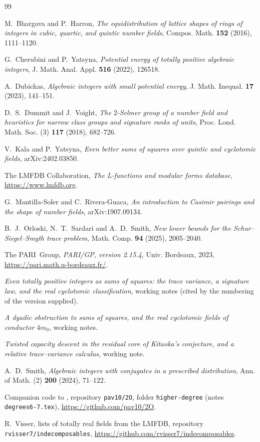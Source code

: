 \documentclass[11pt,reqno]{amsart}
\theoremstyle{plain}
\theoremstyle{definition}
\begin{document}
\begin{thebibliography}{99}

 M.~Bhargava and P.~Harron, \emph{The equidistribution of lattice shapes of rings of
integers in cubic, quartic, and quintic number fields}, Compos. Math. \textbf{152} (2016),
1111--1120.

 G.~Cherubini and P.~Yatsyna, \emph{Potential energy of totally positive algebraic
integers}, J. Math. Anal. Appl. \textbf{516} (2022), 126518.

 A.~Dubickas, \emph{Algebraic integers with small potential energy}, J. Math.
Inequal. \textbf{17} (2023), 141--151.

 D.~S.~Dummit and J.~Voight, \emph{The $2$-Selmer group of a number field and
heuristics for narrow class groups and signature ranks of units}, Proc. Lond. Math. Soc. (3)
\textbf{117} (2018), 682--726.

 V.~Kala and P.~Yatsyna, \emph{Even better sums of squares over quintic and cyclotomic
fields}, arXiv:2402.03850.

 The LMFDB Collaboration, \emph{The L-functions and modular forms database},
\url{https://www.lmfdb.org}.

 G.~Mantilla-Soler and C.~Rivera-Guaca, \emph{An introduction to Casimir pairings
and the shape of number fields}, arXiv:1907.09134.

 B.~J.~Orloski, N.~T.~Sardari and A.~D.~Smith, \emph{New lower bounds for the
Schur--Siegel--Smyth trace problem}, Math. Comp. \textbf{94} (2025), 2005--2040.

 The PARI~Group, \emph{PARI/GP, version 2.15.4}, Univ. Bordeaux, 2023,
\url{https://pari.math.u-bordeaux.fr/}.

 \emph{Even totally positive integers as sums of squares: the trace variance, a
signature law, and the real cyclotomic classification}, working notes (cited by the numbering of
the version supplied).

 \emph{A dyadic obstruction to sums of squares, and the real cyclotomic fields of
conductor $4m_0$}, working notes.

 \emph{Twisted capacity descent in the residual core of Kitaoka's conjecture, and a
relative trace--variance calculus}, working note.

 A.~D.~Smith, \emph{Algebraic integers with conjugates in a prescribed
distribution}, Ann. of Math. (2) \textbf{200} (2024), 71--122.

 Companion code to \cite{KY}, repository \texttt{pav10/2O}, folder
\texttt{higher-degree} (notes \texttt{degrees6-7.tex}), \url{https://github.com/pav10/2O}.

 R.~Visser, lists of totally real fields from the LMFDB, repository
\texttt{rvisser7/indecomposables}, \url{https://github.com/rvisser7/indecomposables}.

\end{thebibliography}
\end{document}
